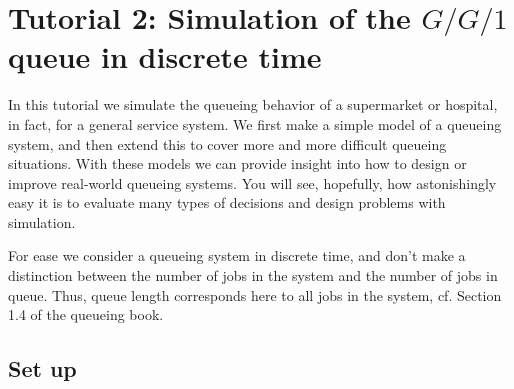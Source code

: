 



\clearpage


\section{Tutorial 2: Simulation of the $G/G/1$ queue in discrete time}
\label{sec:single-server-queue}

In this tutorial we simulate the queueing behavior of a supermarket or hospital, in fact, for a general service system. We first make a simple model of a queueing system, and then extend this to cover more and more difficult queueing situations. With these models we can provide insight into how to design or improve real-world queueing systems.  You will see, hopefully, how astonishingly easy it is to evaluate many types of decisions and design problems with simulation.  

For ease we  consider a queueing system in discrete time, and don't make a distinction between the number of jobs in the system and the number of jobs in queue. Thus, queue length corresponds here to all jobs in the system, cf. Section 1.4 of the queueing book. 

\subsection{Set up}
\label{sec:set-up}


